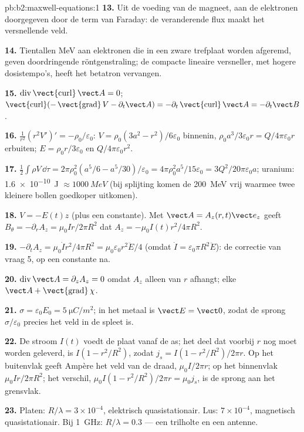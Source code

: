 \begin{solution}{pb:b2:maxwell-equations:1}
\textbf{13.} Uit de voeding van de magneet, aan de elektronen doorgegeven
door de term van Faraday: de veranderende flux maakt het versnellende veld.

\textbf{14.} Tientallen MeV aan elektronen die in een zware trefplaat worden
afgeremd, geven doordringende röntgenstraling; de compacte lineaire
versneller, met hogere dosistempo's, heeft het betatron vervangen.

\textbf{15.} $\operatorname{div}\operatorname{\vect{curl}}\vect A = 0$;
$\operatorname{\vect{curl}}(-\operatorname{\vect{grad}}
V - \partial_t\vect A) = -\partial_t\operatorname{\vect{curl}}\vect A = -\partial_t\vect B$.

\textbf{16.} $\frac1{r^2}(r^2V')' = -\rho_0/\varepsilon_0$:
$V = \rho_0(3a^2 - r^2)/6\varepsilon_0$ binnenin,
$\rho_0a^3/3\varepsilon_0r = Q/4\pi\varepsilon_0r$ erbuiten;
$E = \rho_0r/3\varepsilon_0$ en $Q/4\pi\varepsilon_0r^2$.

\textbf{17.}
$\tfrac12\int\rho V\,\dd\tau = 2\pi\rho_0^2(a^5/6 - a^5/30)/\varepsilon_0 = 4\pi\rho_0^2a^5/
15\varepsilon_0 = 3Q^2/20\pi\varepsilon_0a$;
uranium: \qty{1.6e-10}{J} $\approx \qty{1000}{MeV}$ (bij splijting komen de
\qty{200}{MeV} vrij waarmee twee kleinere bollen goedkoper uitkomen).

\textbf{18.} $V = -E(t)z$ (plus een constante). Met
$\vect A = A_z(r, t)\vect e_z$ geeft
$B_\theta = -\partial_rA_z = \mu_0Ir/2\pi R^2$ dat
$A_z = -\mu_0I(t)r^2/4\pi R^2$.

\textbf{19.}
$-\partial_tA_z = \mu_0\dot Ir^2/4\pi R^2 = \mu_0\varepsilon_0r^2\ddot E/4$
(omdat $\dot I =
\varepsilon_0\pi R^2\ddot E$): de correctie van vraag 5, op
een constante na.

\textbf{20.} $\operatorname{div}\vect A = \partial_zA_z = 0$ omdat $A_z$
alleen van $r$ afhangt; elke $\vect A + \operatorname{\vect{grad}}\chi$.

\textbf{21.} $\sigma = \varepsilon_0E_0 = \qty{5}{\micro C/m^2}$; in het
metaal is $\vect E =
\vect 0$, zodat de sprong $\sigma/\varepsilon_0$
precies het veld in de spleet is.

\textbf{22.} De stroom $I(t)$ voedt de plaat vanaf de as; het deel dat
voorbij $r$ nog moet worden geleverd, is $I(1 - r^2/R^2)$, zodat
$j_s = I(1 -
r^2/R^2)/2\pi r$. Op het buitenvlak geeft Ampère het veld van
de draad, $\mu_0I/
2\pi r$; op het binnenvlak $\mu_0Ir/2\pi R^2$; het
verschil, $\mu_0I(1 -
r^2/R^2)/2\pi r = \mu_0j_s$, is de sprong aan het
grensvlak.

\textbf{23.} Platen: $R/\lambda = 3 \times 10^{-4}$, elektrisch
quasistationair. Lus: $7 \times 10^{-4}$, magnetisch quasistationair. Bij
\qty{1}{GHz}: $R/\lambda = 0.3$ --- een trilholte en een antenne.


\end{solution}
